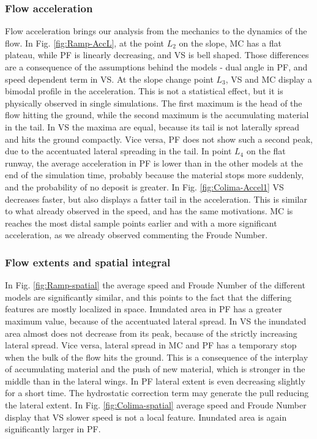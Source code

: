 \documentclass{article}
\begin{document}
\subsubsection{Flow acceleration}
Flow acceleration brings our analysis from the mechanics to the dynamics of the flow. In Fig. \ref{fig:Ramp-AccL}, at the point $L_2$ on the slope, MC has a flat plateau, while PF is linearly decreasing, and VS is bell shaped. Those differences are a consequence of the assumptions behind the models - dual angle in PF, and speed dependent term in VS. At the slope change point $L_3$, VS and MC display a bimodal profile in the acceleration. This is not a statistical effect, but it is physically observed in single simulations. The first maximum is the head of the flow hitting the ground, while the second maximum is the accumulating material in the tail. In VS the maxima are equal, because its tail is not laterally spread and hits the ground compactly. Vice versa, PF does not show such a second peak, due to the accentuated lateral spreading in the tail. In point $L_4$ on the flat runway, the average acceleration in PF is lower than in the other models at the end of the simulation time, probably because the material stops more suddenly, and the probability of no deposit is greater. In Fig. \ref{fig:Colima-Accel1} VS decreases faster, but also displays a fatter tail in the acceleration. This is similar to what already observed in the speed, and has the same motivations. MC is reaches the most distal sample points earlier and with a more significant acceleration, as we already observed commenting the Froude Number.

\subsubsection{Flow extents and spatial integral}
In Fig. \ref{fig:Ramp-spatial} the average speed and Froude Number of the different models are significantly similar, and this points to the fact that the differing features are mostly localized in space. Inundated area in PF has a greater maximum value, because of the accentuated lateral spread. In VS the inundated area almost does not decrease from its peak, because of the strictly increasing lateral spread. Vice versa, lateral spread in MC and PF has a temporary stop when the bulk of the flow hits the ground. This is a consequence of the interplay of accumulating material and the push of new material, which is stronger in the middle than in the lateral wings. In PF lateral extent is even decreasing slightly for a short time. The hydrostatic correction term may generate the pull reducing the lateral extent. In Fig. \ref{fig:Colima-spatial} average speed and Froude Number display that VS slower speed is not a local feature. Inundated area is again significantly larger in PF.
\end{document}
